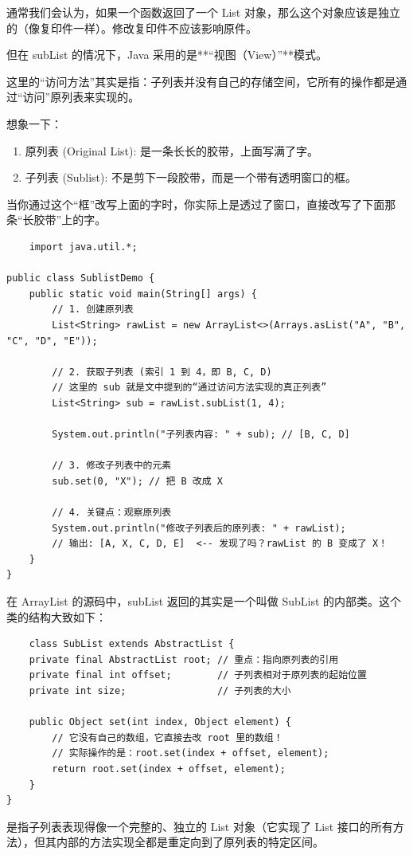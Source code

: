 \documentclass[12pt, a4paper, openany]{ctexbook} %
\begin{document}
通常我们会认为，如果一个函数返回了一个 List 对象，那么这个对象应该是独立的（像复印件一样）。修改复印件不应该影响原件。
\par
但在 subList 的情况下，Java 采用的是**“视图（View）”**模式。
\par
这里的“访问方法”其实是指：子列表并没有自己的存储空间，它所有的操作都是通过“访问”原列表来实现的。
\par
想象一下：
\begin{enumerate}
    \item 原列表 (Original List): 是一条长长的胶带，上面写满了字。
    \item 子列表 (Sublist): 不是剪下一段胶带，而是一个带有透明窗口的框。
\end{enumerate}
\par
当你通过这个“框”改写上面的字时，你实际上是透过了窗口，直接改写了下面那条“长胶带”上的字。
\begin{lstlisting}
    import java.util.*;

public class SublistDemo {
    public static void main(String[] args) {
        // 1. 创建原列表
        List<String> rawList = new ArrayList<>(Arrays.asList("A", "B", "C", "D", "E"));

        // 2. 获取子列表 (索引 1 到 4，即 B, C, D)
        // 这里的 sub 就是文中提到的“通过访问方法实现的真正列表”
        List<String> sub = rawList.subList(1, 4);

        System.out.println("子列表内容: " + sub); // [B, C, D]

        // 3. 修改子列表中的元素
        sub.set(0, "X"); // 把 B 改成 X

        // 4. 关键点：观察原列表
        System.out.println("修改子列表后的原列表: " + rawList);
        // 输出: [A, X, C, D, E]  <-- 发现了吗？rawList 的 B 变成了 X！
    }
}
\end{lstlisting}
在 ArrayList 的源码中，subList 返回的其实是一个叫做 SubList 的内部类。这个类的结构大致如下：
\begin{lstlisting}
    class SubList extends AbstractList {
    private final AbstractList root; // 重点：指向原列表的引用
    private final int offset;        // 子列表相对于原列表的起始位置
    private int size;                // 子列表的大小

    public Object set(int index, Object element) {
        // 它没有自己的数组，它直接去改 root 里的数组！
        // 实际操作的是：root.set(index + offset, element);
        return root.set(index + offset, element);
    }
}
\end{lstlisting}
是指子列表表现得像一个完整的、独立的 List 对象（它实现了 List 接口的所有方法），但其内部的方法实现全都是重定向到了原列表的特定区间。
\end{document}
